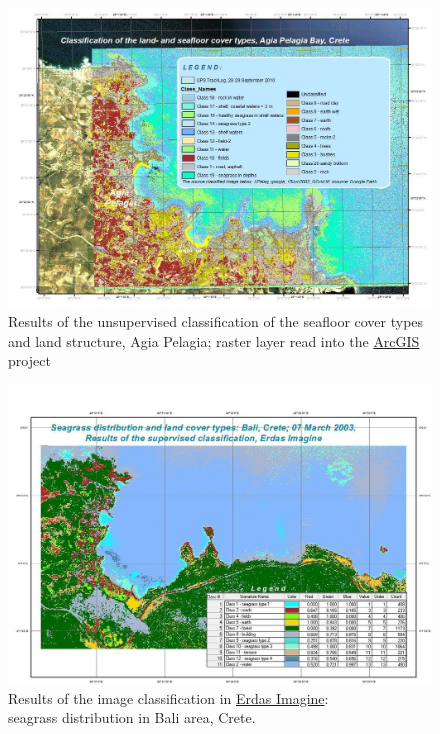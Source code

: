 \documentclass[11pt]{article}
\begin{document}
\begin{appendices}
\begin{figure}[H]
\begin{center}
	\end{center}	
\end{figure}
\begin{figure}[H]
	\begin{center}
		\includegraphics[scale=0.25]{Fig-39.jpg}
		\caption{Results of the unsupervised classification of the seafloor cover types and land structure, Agia Pelagia; raster layer read into the \href{http://www.esri.com/software/arcgis/index.html}{ArcGIS} project}
		\label{fig:42}
	\end{center}
\end{figure}
\begin{figure}
	\begin{center}
		\includegraphics[scale=0.40]{Fig-36.jpg}
		\caption{Results of the image classification in \href{http://www.erdas.com/products/ERDASIMAGINE/ERDASIMAGINE/Details.aspx}{Erdas Imagine}: \\ seagrass distribution in Bali area, Crete. }
		\label{fig:39}
	\end{center}
\end{figure}
\pagebreak


\end{appendices}
\end{document}
